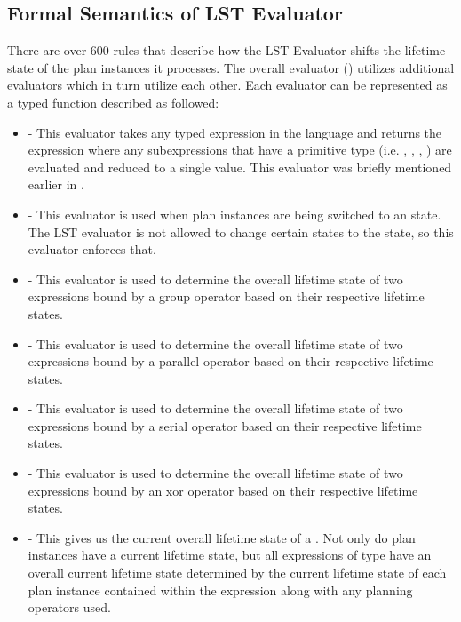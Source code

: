 \subsection{Formal Semantics of LST Evaluator}
There are over 600 rules that describe how the LST Evaluator shifts the lifetime state of the plan instances it processes. The overall evaluator () utilizes additional evaluators which in turn utilize each other.  Each evaluator can be represented as a typed function described as followed:
\begin{itemize}
\item \textbf{} - This evaluator takes any typed expression in the language and returns the expression where any subexpressions that have a primitive type (i.e. , , , ) are evaluated and reduced to a single value. This evaluator was briefly mentioned earlier in .
\item \textbf{} - This evaluator is used when plan instances are being switched to an  state. The LST evaluator is not allowed to change certain states to the  state, so this evaluator enforces that.
\item \textbf{} - This evaluator is used to determine the overall lifetime state of two expressions bound by a group operator based on their respective lifetime states.
\item \textbf{} - This evaluator is used to determine the overall lifetime state of two expressions bound by a parallel operator based on their respective lifetime states.
\item \textbf{} - This evaluator is used to determine the overall lifetime state of two expressions bound by a serial operator based on their respective lifetime states.
\item \textbf{} - This evaluator is used to determine the overall lifetime state of two expressions bound by an xor operator based on their respective lifetime states.
\item \textbf{} - This gives us the current overall lifetime state of a . Not only do plan instances have a current lifetime state, but all expressions of type  have an overall current lifetime state determined by the current lifetime state of each plan instance contained within the expression along with any planning operators used.

\end{itemize}
